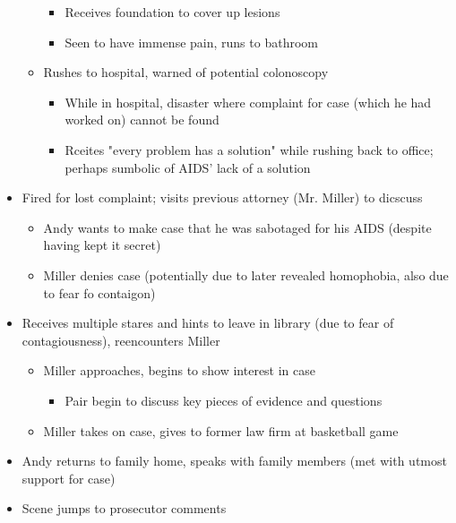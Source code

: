 \documentclass{article}
\begin{document}
\begin{itemize}
\begin{itemize}
            \begin{itemize}
                \item Receives foundation to cover up lesions
                \item Seen to have immense pain, runs to bathroom
            \end{itemize}
            \item Rushes to hospital, warned of potential colonoscopy 
            \begin{itemize}
                \item While in hospital, disaster where complaint for case (which he had worked on) cannot be found
                \item Rceites "every problem has a solution" while rushing back to office; perhaps sumbolic of AIDS' lack of a solution
            \end{itemize}
        \end{itemize}
        \item Fired for lost complaint; visits previous attorney (Mr. Miller) to dicscuss
        \begin{itemize}
            \item Andy wants to make case that he was sabotaged for his AIDS (despite having kept it secret)
            \item Miller denies case (potentially due to later revealed homophobia, also due to fear fo contaigon)
        \end{itemize}
        \item Receives multiple stares and hints to leave in library (due to fear of contagiousness), reencounters Miller
        \begin{itemize}
            \item Miller approaches, begins to show interest in case 
            \begin{itemize}
                \item Pair begin to discuss key pieces of evidence and questions
            \end{itemize}
            \item Miller takes on case, gives to former law firm at basketball game
        \end{itemize}
        \item Andy returns to family home, speaks with family members (met with utmost support for case)
        \item Scene jumps to prosecutor comments 
        \begin{itemize}

\end{itemize}
\end{itemize}
\end{document}
